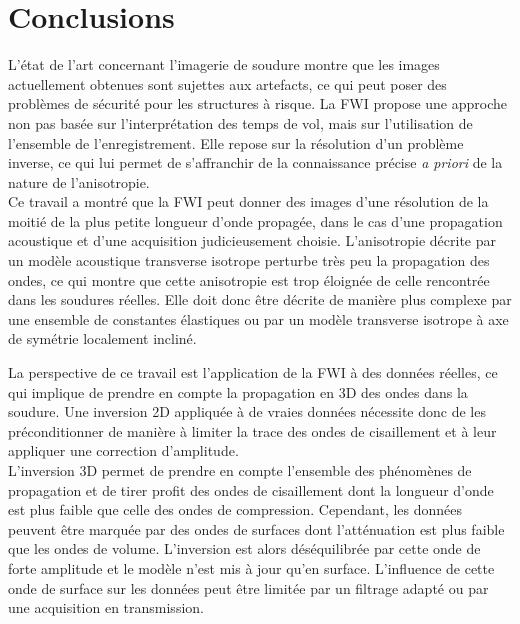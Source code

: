 \chapter*{Conclusions}

L'état de l'art concernant l'imagerie de soudure montre que les images actuellement obtenues sont sujettes aux artefacts, ce qui peut poser des problèmes de sécurité pour les structures à risque. La FWI propose une approche non pas basée sur l'interprétation des temps de vol, mais sur l'utilisation de l'ensemble de l'enregistrement. Elle repose sur la résolution d'un problème inverse, ce qui lui permet de s'affranchir de la connaissance précise \emph{a priori} de la nature de l'anisotropie.\\

Ce travail a montré que la FWI peut donner des images d'une résolution de la moitié de la plus petite longueur d'onde propagée, dans le cas d'une propagation acoustique et d'une acquisition judicieusement choisie. L'anisotropie  décrite par un modèle acoustique transverse isotrope perturbe très peu la propagation des ondes, ce qui montre que cette anisotropie est trop éloignée de celle rencontrée dans les soudures réelles. Elle doit donc être décrite de manière plus complexe par une ensemble de constantes élastiques ou par un modèle transverse isotrope à axe de symétrie localement incliné.





La perspective de ce travail est l'application de la FWI à des données réelles, ce qui implique de prendre en compte la propagation en 3D des ondes dans la soudure. Une inversion 2D appliquée à de vraies données nécessite donc de les préconditionner de manière à limiter la trace des ondes de cisaillement et à leur appliquer une correction d'amplitude. \\

L'inversion 3D permet de prendre en compte l'ensemble des phénomènes de propagation et de tirer profit des ondes de cisaillement dont la longueur d'onde est plus faible que celle des ondes de compression. Cependant, les données peuvent être marquée par des ondes de surfaces dont l'atténuation est plus faible que les ondes de volume.  L'inversion est alors déséquilibrée par cette onde de forte amplitude et le modèle n'est mis à jour qu'en surface. L'influence de cette onde de surface sur les données peut être limitée par un filtrage adapté ou par une acquisition en transmission.\\ 


